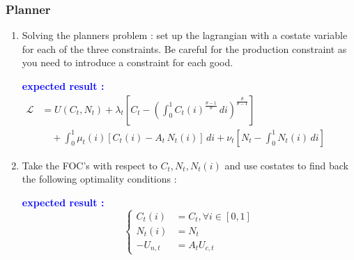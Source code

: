 \documentclass{article}
\begin{document}
\subsubsection{Planner}
\begin{enumerate}
    \item Solving the planners problem : set up the lagrangian with a costate variable for each of the three constraints. Be careful for the production constraint as you need to introduce a constraint for each good.
    \begin{expectedresultsbox}
        \textcolor{blue}{\textbf{expected result : }}  $\begin{aligned}\mathcal{L} &= U(C_t, N_t) + \lambda_t \left[ C_t - \left(\int_0^1 C_t(i)^{\frac{\theta-1}{\theta}}\, di \right)^{\frac{\theta}{\theta-1}} \right] \ \\[1em]&\quad+ \int_0^1 \mu_t(i) \left[ C_t(i) - A_t\, N_t(i) \right]\, di  + \nu_t \left[ N_t - \int_0^1 N_t(i)\, di \right]\end{aligned}$ 
    \end{expectedresultsbox}
    \item Take the FOC's with respect to $C_t, N_t, N_t(i)$ and use costates to find back the following optimality conditions : 
    \begin{expectedresultsbox}
         \textcolor{blue}{\textbf{expected result : }} \begin{equation}
        \left\{
        \begin{aligned}
            C_t(i)&=C_t, \forall i\in[0,1]\\
            N_t(i) &= N_t\\
            -U_{n,t}&=A_tU_{c,t}
        \end{aligned}   
        \right.
        \end{equation}
    \end{expectedresultsbox}
\end{enumerate}
\end{document}
